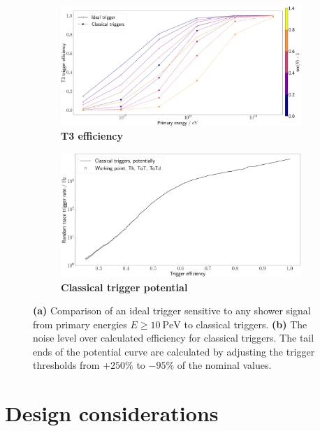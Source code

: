 \begin{figure}
	\begin{subfigure}[b]{0.49\textwidth}
		\centering
		\includegraphics[width=\textwidth]{./plots/ideal_t3_efficiency.png}
		\caption{\textbf{T3 efficiency}}
		\label{fig:ideal-efficiency-comparison}
	\end{subfigure}
	\hfill
	\begin{subfigure}[b]{0.49\textwidth}
		\centering
		\includegraphics[width=\textwidth]{./plots/classical_trigger_ROC.png}
		\caption{\textbf{Classical trigger potential}}
		\label{fig:classical-trigger-roc}
	\end{subfigure}
	\caption{\textbf{(a)} Comparison of an ideal trigger sensitive to any shower signal from primary energies $E\geq\SI{10}{\peta\electronvolt}$ to classical 
    triggers. \textbf{(b)} The noise level over calculated efficiency for classical triggers. The tail ends of the potential curve are calculated by adjusting the
    trigger thresholds from $+250\%$ to $-95\%$ of the nominal values.}
\end{figure}

\section{Design considerations}
\label{sec:design-considerations}


